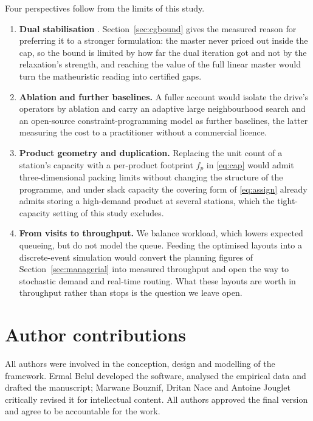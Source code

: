 \documentclass[]{interact}
\begin{document}
Four perspectives follow from the limits of this study.
\begin{enumerate}
\item \textbf{Dual stabilisation} \citep{dumerle1999stabilized, wentges1997weighted}. Section~\ref{sec:cgbound} gives the measured reason for preferring it to a stronger formulation: the master never priced out inside the cap, so the bound is limited by how far the dual iteration got and not by the relaxation's strength, and reaching the value of the full linear master would turn the matheuristic reading into certified gaps.
\item \textbf{Ablation and further baselines.} A fuller account would isolate the drive's operators by ablation and carry an adaptive large neighbourhood search and an open-source constraint-programming model \citep{ropke2006alns, perron2023cpsat} as further baselines, the latter measuring the cost to a practitioner without a commercial licence.
\item \textbf{Product geometry and duplication.} Replacing the unit count of a station's capacity with a per-product footprint $f_p$ in \eqref{eq:cap} would admit three-dimensional packing limits without changing the structure of the programme, and under slack capacity the covering form of \eqref{eq:assign} already admits storing a high-demand product at several stations, which the tight-capacity setting of this study excludes.
\item \textbf{From visits to throughput.} We balance workload, which lowers expected queueing, but do not model the queue. Feeding the optimised layouts into a discrete-event simulation would convert the planning figures of Section~\ref{sec:managerial} into measured throughput and open the way to stochastic demand and real-time routing. What these layouts are worth in throughput rather than stops is the question we leave open.
\end{enumerate}

\section*{Author contributions}
All authors were involved in the conception, design and modelling of the framework. Ermal Belul developed the software, analysed the empirical data and drafted the manuscript; Marwane Bouznif, Dritan Nace and Antoine Jouglet critically revised it for intellectual content. All authors approved the final version and agree to be accountable for the work.
\end{document}
